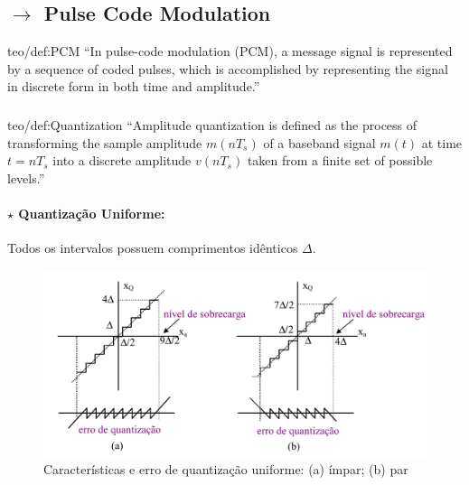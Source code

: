 \clearpage
\subsection[3.3 Pulse Code Modulation]{$\rightarrow$ Pulse Code Modulation}
\label{subsec:PCM}

\begin{theo}{teo/def:PCM}\label{teo/def:PCM}
     ``In pulse-code modulation (PCM), a message signal is represented by a sequence of coded pulses, which is accomplished by representing the signal in discrete form in both time and amplitude.''
\end{theo}

\subsubsection[3.3.1 Quantização]{}
\label{subsubsec:quantization}
\vspace{-3em}
\begin{theo}{teo/def:Quantization}\label{teo/def:Quantization}
 ``Amplitude quantization is defined as the process of transforming the sample amplitude $m(nT_s)$ of a baseband signal $m(t)$ at time $t = nT_s$ into a discrete amplitude $v(nT_s)$ taken from a finite set of possible levels.''
\end{theo}
\vspace{-2em}
\paragraph[3.3.1.1 Quantização Uniforme]{$\pmb{\star}$ Quantização Uniforme:}
Todos os intervalos possuem comprimentos idênticos $\Delta$.
\label{subsubsec:quantizationU}
\vspace{-1em}
\begin{figure}[H]
    \centering
    \includegraphics[width = 0.8\linewidth]{img/digital/PCM/QuantizacaoU.png}
    \caption{Características e erro de quantização uniforme: (a) ímpar; (b) par}
    \label{fig:QuantizacaoU}
\end{figure}

